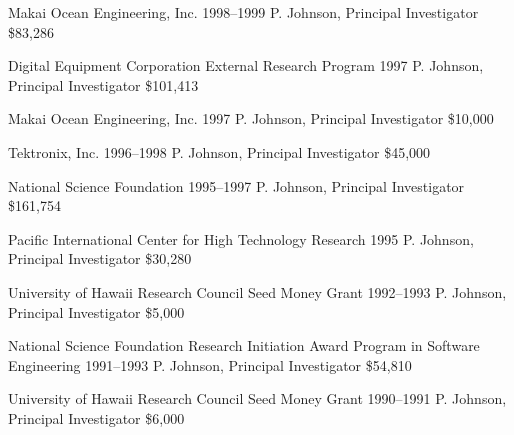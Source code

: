 \documentclass[11pt,letterpaper,sans]{moderncv} %
\begin{document}
        {Makai Ocean Engineering, Inc.} %
        {1998--1999} %
        {P. Johnson, Principal Investigator}  %
        {\$83,286} %

        {Digital Equipment Corporation External Research Program} %
        {1997} %
        {P. Johnson, Principal Investigator}  %
        {\$101,413} %

        {Makai Ocean Engineering, Inc.} %
        {1997} %
        {P. Johnson, Principal Investigator}  %
        {\$10,000} %

        {Tektronix, Inc.} %
        {1996--1998} %
        {P. Johnson, Principal Investigator}  %
        {\$45,000} %

        {National Science Foundation} %
        {1995--1997} %
        {P. Johnson, Principal Investigator}  %
        {\$161,754} %

        {Pacific International Center for High Technology Research} %
        {1995} %
        {P. Johnson, Principal Investigator}  %
        {\$30,280} %

        {University of Hawaii Research Council Seed Money Grant} %
        {1992--1993} %
        {P. Johnson, Principal Investigator}  %
        {\$5,000} %

        {National Science Foundation Research Initiation Award Program in Software Engineering} %
        {1991--1993} %
        {P. Johnson, Principal Investigator}  %
        {\$54,810} %

        {University of Hawaii Research Council Seed Money Grant} %
        {1990--1991} %
        {P. Johnson, Principal Investigator}  %
        {\$6,000} %
\end{document}
